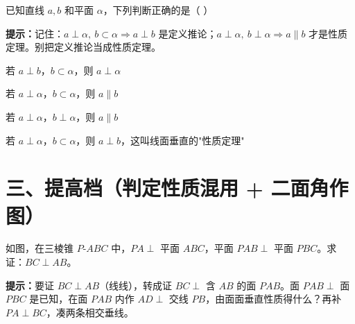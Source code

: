 \documentclass{exam-zh}
\begin{document}
\begin{question}[points=5]
  \noindent
  \begin{minipage}[t]{\dimexpr\linewidth-60mm-6mm\relax}
    \vspace{0pt}
    已知直线 $a,b$ 和平面 $\alpha$，下列判断正确的是（    ）
    \begin{hintbox}
\textbf{提示：}记住：$a\perp\alpha,\ b\subset\alpha\Rightarrow a\perp b$ 是定义推论；$a\perp\alpha,\ b\perp\alpha\Rightarrow a\parallel b$ 才是性质定理。别把定义推论当成性质定理。\end{hintbox}

    \par
    \begin{choices}[columns=1]
      \item 若 $a\perp b$，$b\subset\alpha$，则 $a\perp\alpha$
      \item 若 $a\perp\alpha$，$b\subset\alpha$，则 $a\parallel b$
      \item 若 $a\perp\alpha$，$b\perp\alpha$，则 $a\parallel b$
      \item 若 $a\perp\alpha$，$b\subset\alpha$，则 $a\perp b$，这叫线面垂直的"性质定理"
    \end{choices}
  \end{minipage}\hfill
  \begin{diagramcoltikz}{60mm}{区分线面垂直的"定义推论"与"性质定理"。}
  }
  \end{diagramcoltikz}
\end{question}



\section*{三、提高档（判定性质混用 + 二面角作图）}


\begin{problem}[points=9]
  \noindent
  \begin{minipage}[t]{\dimexpr\linewidth-60mm-6mm\relax}
    \vspace{0pt}
    如图，在三棱锥 $P\text{-}ABC$ 中，$PA\perp$ 平面 $ABC$，平面 $PAB\perp$ 平面 $PBC$。求证：$BC\perp AB$。

    \begin{hintbox}
\textbf{提示：}要证 $BC\perp AB$（线线），转成证 $BC\perp$ 含 $AB$ 的面 $PAB$。面 $PAB\perp$ 面 $PBC$ 是已知，在面 $PAB$ 内作 $AD\perp$ 交线 $PB$，由面面垂直性质得什么？再补 $PA\perp BC$，凑两条相交垂线。\end{hintbox}

  \end{minipage}\hfill
  \begin{diagramcoltikz}{60mm}{三棱锥 P-ABC，PA⊥面 ABC，面 PAB⊥面 PBC，找 BC 的两条相交垂线。}
  }
  \end{diagramcoltikz}
  \par\medskip
  \answerarea[56mm]
\end{problem}
\end{document}
